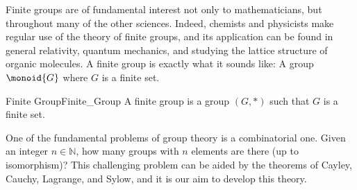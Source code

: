 Finite groups are of fundamental interest not only to mathematicians, but
throughout many of the other sciences. Indeed, chemists and physicists make
regular use of the theory of finite groups, and its application can be found in
general relativity, quantum mechanics, and studying the lattice structure of
organic molecules. A finite group is exactly what it sounds like: A group
$\monoid{G}$ where $G$ is a finite set.
\begin{fdefinition}{Finite Group}{Finite_Group}
    A finite group is a \gls{group} $(G,*)$ such that $G$ is a
    finite set.
\end{fdefinition}
One of the fundamental problems of group theory is a combinatorial one. Given an
integer $n\in\mathbb{N}$, how many groups with $n$ elements are there (up to
isomorphism)? This challenging problem can be aided by the theorems of Cayley,
Cauchy, Lagrange, and Sylow, and it is our aim to develop this theory.
